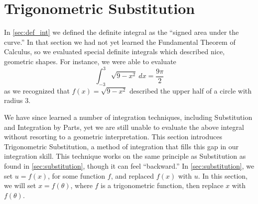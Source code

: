 

\section{Trigonometric Substitution}\label{sec:trig_sub}

In \autoref{sec:def_int} we defined the definite integral as the ``signed area under the curve.'' In that section we had not yet learned the Fundamental Theorem of Calculus, so we evaluated special definite integrals which described nice, geometric shapes. For instance, we were able to evaluate
\begin{equation}
\int_{-3}^3\sqrt{9-x^2}\ dx = \frac{9\pi}{2}\label{eq:trigsub1}
\end{equation}
 as we recognized that $f(x) = \sqrt{9-x^2}$ described the upper half of a circle with radius 3. 

We have since learned a number of integration techniques, including Substitution and Integration by Parts, yet we are still unable to evaluate the above integral without resorting to a geometric interpretation. This section introduces Trigonometric Substitution, a method of integration that fills this gap in our integration skill. This technique works on the same principle as Substitution as found in \autoref{sec:substitution}, though it can feel ``backward.'' In \autoref{sec:substitution}, we set $u=f(x)$, for some function $f$, and replaced $f(x)$ with $u$. In this section, we will set $x=f(\theta)$, where $f$ is a trigonometric function, then replace $x$ with $f(\theta)$. 


